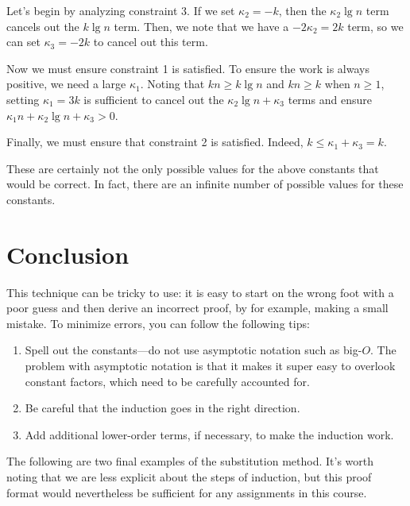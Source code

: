 \begin{flex}
\begin{gram}
Let's begin by analyzing constraint 3. If we set $\kappa_2 = -k$, then the $\kappa_2 \lg n$ term cancels out the
$k \lg n$ term. Then, we note that we have a $-2 \kappa_2 = 2k$ term, so we can
set $\kappa_3 = -2k$ to cancel out this term.

Now we must ensure constraint 1 is satisfied. To ensure the work is always
positive, we need a large $\kappa_1$. Noting that $kn \geq k \lg n$ and $kn \geq k$
when $n \geq 1$, setting $\kappa_1 = 3k$ is sufficient to cancel out the
$\kappa_2 \lg n + \kappa_3$ terms and ensure $\kappa_1 n + \kappa_2 \lg n + \kappa_3 > 0$.

Finally, we must ensure that constraint 2 is satisfied. Indeed,
$k \leq \kappa_1 + \kappa_3 = k$.
\end{gram}

\begin{note}
These are certainly not the only possible values for the above constants that
would be correct. In fact, there are an infinite number of possible values
for these constants.
\end{note}
\end{flex}

\section{Conclusion}
\begin{important}
This technique can be tricky to use: it is easy to start on the wrong
foot with a poor guess and then derive an incorrect proof, by for example,
making a small mistake.
%
To minimize errors, you can follow the following tips:
\begin{enumerate}
\item Spell out the constants---do not use asymptotic notation such as
  big-$O$.  The problem with asymptotic notation is that it makes it
  super easy to overlook constant factors, which need to be carefully
  accounted for.

\item Be careful that the induction goes in the right direction.

\item Add additional lower-order terms, if necessary, to make the
  induction work.
\end{enumerate}
\end{important}

\begin{gram}
The following are two final examples of the substitution method. It's worth noting that
we are less explicit about the steps of induction, but this proof format
would nevertheless be sufficient for any assignments in this course.
\end{gram}

